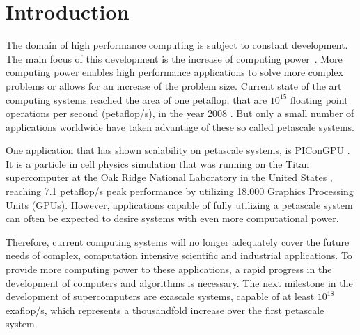 \chapter{Introduction}
\label{sec:intro}



The domain of high performance computing is subject to constant
development.  The main focus of this development is the increase of
computing power~\cite{ref:performance_development}.  More computing power enables high performance
applications to solve more complex problems or allows for an increase of the problem
size.  Current state of the art computing systems reached the area of
one petaflop, that are $10^{15}$ floating point operations per second
(petaflop/s), in the year 2008 \cite{ref:ibm_roadrunner}. But only a
small number of applications worldwide have taken advantage of these
so called petascale systems.

One application that has shown scalability on petascale systems, is
PIConGPU \cite{ref:picongpu_scale}. It is a particle in cell physics
simulation that was running on the Titan supercomputer at the Oak
Ridge National Laboratory in the United States \cite{ref:titan},
reaching 7.1 petaflop/s peak performance by utilizing 18.000 Graphics
Processing Units (GPUs). However, applications capable of fully
utilizing a petascale system can often be expected to desire systems
with even more computational power.

Therefore, current computing systems will no longer adequately cover
the future needs of complex, computation intensive scientific and
industrial applications.  To provide more computing power to these
applications, a rapid progress in the development of computers and
algorithms is necessary. The next milestone in the development of
supercomputers are exascale systems, capable of at least $10^{18}$
exaflop/s, which represents a thousandfold increase over the first
petascale system.

